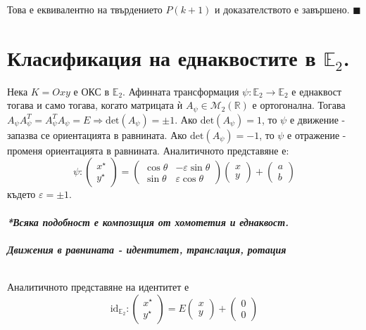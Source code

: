 \documentclass[12pt]{article}
\begin{document}
Това е еквивалентно на твърдението $P(k+1)$ и доказателството е завършено. $\blacksquare$
\Large{\section{ Класификация на еднаквостите в $\mathbb{E}_2$.}}
Нека $K=Oxy$ е ОКС в $\mathbb{E}_2$. Афинната трансформация $\psi:\mathbb{E}_2\to\mathbb{E}_2$ е еднаквост тогава и само тогава, когато матрицата ѝ $A_\psi\in \mathcal M_2(\mathbb{R})$ е ортогонална. Тогава $A_\psi A_\psi^{T}= A_\psi^{T}A_\psi=E\Rightarrow \mathrm{det}(A_\psi)=\pm 1$. Ако $\mathrm{det}(A_\psi)=1$, то $\psi$ е движение - запазва се ориентацията в равнината. Ако $\mathrm{det}(A_\psi)=-1$, то $\psi$ е отражение - променя ориентацията в равнината. Аналитичното представяне е: $$\psi:\begin{pmatrix} x^\star \\ y^{\star}\end{pmatrix}=\begin{pmatrix}\cos\theta & -\varepsilon\sin\theta \\ \sin\theta & \varepsilon\cos\theta\end{pmatrix}\begin{pmatrix} x \\ y\end{pmatrix}+\begin{pmatrix} a \\ b\end{pmatrix}$$
където $\varepsilon=\pm 1$.
\\
\\
\textbf{\textit{*Всяка подобност е композиция от хомотетия и еднаквост.}}
\\
\\
\textbf{\textit{Движения в равнината - идентитет, транслация, ротация}}
\\
\\
\begin{tcolorbox}[
    colback=blue!5,    %
    colframe=blue!75!black, %
    title={\textbf{Твърдение 15:}}, %
    fonttitle=\bfseries,
    boxrule=0.8pt,
    arc=1mm,           %
    top=2mm, bottom=2mm, left=3mm, right=3mm
]  Аналитичното представяне на идентитет е $$\mathrm{id}_{\mathbb E_2}:\begin{pmatrix} x^\star \\ y^{\star}\end{pmatrix}=E\begin{pmatrix} x \\ y\end{pmatrix}+\begin{pmatrix} 0 \\ 0\end{pmatrix}$$
\end{tcolorbox}
\end{document}
